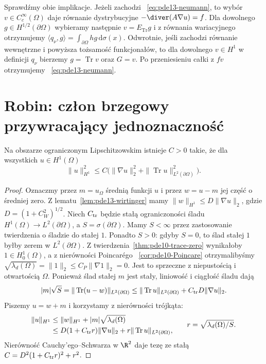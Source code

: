 \begin{uwaga}
Sprawdźmy obie implikacje. Jeżeli zachodzi
~\eqref{eq:pde13-neumann}, to wybór $v\in C_c^\infty(\Omega)$
daje równanie dystrybucyjne $-\diver(A\nabla u)=f$.
Dla dowolnego $g\in H^{1/2}(\partial\Omega)$
wybieramy następnie $v=E_{\operatorname{Tr}}g$ i z równania
wariacyjnego otrzymujemy
$\langle q_\nu,g\rangle=\int_{\partial\Omega}hg\,\mathrm d\sigma(x)$.
Odwrotnie, jeśli zachodzi równanie wewnętrzne i powyższa
tożsamość funkcjonałów, to dla dowolnego $v\in H^1$
w definicji $q_\nu$ bierzemy $g=\operatorname{Tr}v$ oraz
$G=v$. Po przeniesieniu całki z $fv$ otrzymujemy
~\eqref{eq:pde13-neumann}.
\end{uwaga}

\section{Robin: człon brzegowy przywracający jednoznaczność}
\label{sec:pde13-robin}
\begin{lemat}
\label{lem:pde13-boundary-poincare}
Na obszarze ograniczonym Lipschitzowskim istnieje
$C>0$ takie, że dla wszystkich $u\in H^1(\Omega)$
\[
\|u\|_{H^1}^2\le C\big(\|\nabla u\|_2^2+
 \|\operatorname{Tr}u\|_{L^2(\partial\Omega)}^2\big).
\]
\end{lemat}
\begin{proof}
Oznaczmy przez $m=u_\Omega$ średnią funkcji $u$
i przez $w=u-m$ jej część o średniej zero.
Z lematu~\ref{lem:pde13-wirtinger} mamy
$\|w\|_{H^1}\le D\|\nabla u\|_2$,
gdzie $D=(1+C_W^2)^{1/2}$.
Niech $C_{\rm tr}$ będzie stałą ograniczoności śladu
$H^1(\Omega)\to L^2(\partial\Omega)$, a $S=\sigma(\partial\Omega)$.
Mamy $S<\infty$ przez zastosowanie twierdzenia o śladzie
do stałej $1$. Ponadto $S>0$: gdyby $S=0$, to ślad stałej
$1$ byłby zerem w $L^2(\partial\Omega)$.
Z twierdzenia~\ref{thm:pde10-trace-zero} wynikałoby
$1\in H_0^1(\Omega)$, a z nierówności Poincarégo
~\ref{cor:pde10-Poincare} otrzymalibyśmy
$\sqrt{\lambda_d(\Omega)}=\|1\|_2\le C_P\|\nabla 1\|_2=0$.
Jest to sprzeczne z niepustością i otwartością $\Omega$.
Ponieważ ślad stałej $m$ jest stały, liniowość i ciągłość
śladu dają
\[
 |m|\sqrt S=\|\operatorname{Tr}(u-w)\|_{L^2(\partial\Omega)}
 \le\|\operatorname{Tr}u\|_{L^2(\partial\Omega)}
 +C_{\rm tr}D\|\nabla u\|_2 .
\]
Piszemy $u=w+m$ i korzystamy z nierówności trójkąta:
\[
 \begin{aligned}
 \|u\|_{H^1}
 &\le \|w\|_{H^1}+|m|\sqrt{\lambda_d(\Omega)}\\
 &\le D(1+C_{\rm tr}r)\|\nabla u\|_2
 +r\|\operatorname{Tr}u\|_{L^2(\partial\Omega)},
 \end{aligned}
 \qquad r=\sqrt{\lambda_d(\Omega)/S}.
\]
Nierówność Cauchy'ego--Schwarza w $\R^2$ daje tezę
ze stałą $C=D^2(1+C_{\rm tr}r)^2+r^2$.
\end{proof}

